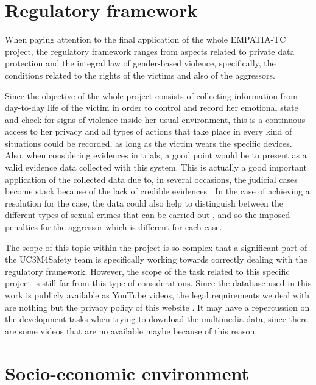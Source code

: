 \section{Regulatory framework}

	When paying attention to the final application of the whole EMPATIA-TC project, the regulatory framework ranges from aspects related to private data protection and the integral law of gender-based violence, specifically, the conditions related to the rights of the victims and also of the aggressors. 
	
	Since the objective of the whole project consists of collecting information from day-to-day life of the victim in order to control and record her emotional state and check for signs of violence inside her usual environment, this is a continuous access to her privacy and all types of actions that take place in every kind of situations could be recorded, as long as the victim wears the specific devices. Also, when considering evidences in trials, a good point would be to present as a valid evidence data collected with this system. This is actually a good important application of the collected data due to, in several occasions, the judicial cases become stack because of the lack of credible evidences \cite{UC3M4SafetyTeam2018}. In the case of achieving a resolution for the case, the data could also help to distinguish between the different types of sexual crimes that can be carried out \cite{Baldwin}, and so the imposed penalties for the aggressor which is different for each case.
	
	The scope of this topic within the project is so complex that a significant part of the UC3M4Safety team is specifically working towards correctly dealing with the regulatory framework. %
	However, the scope of the task related to this specific project is still far from this type of considerations. Since the database used in this work is publicly available as YouTube videos, the legal requirements we deal with are nothing but the privacy policy of this website \cite{Goetzparterns}. It may have a repercussion on the development tasks when trying to download the multimedia data, since there are some videos that are no available maybe because of this reason. 

\section{Socio-economic environment}
	
